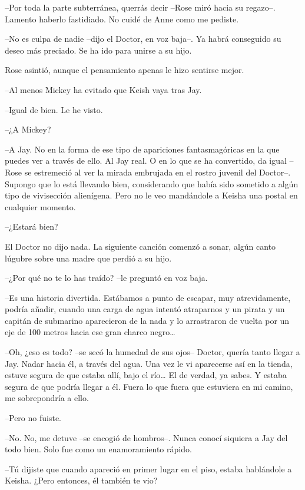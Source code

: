 {--Por toda la parte subterránea, querrás decir --Rose miró hacia su
regazo--. Lamento haberlo fastidiado. No cuidé de Anne como me pediste.}

{--No es culpa de nadie --dijo el Doctor, en voz baja--. Ya habrá
conseguido su deseo más preciado. Se ha ido para unirse a su hijo.}

{Rose asintió, aunque el pensamiento apenas le hizo sentirse mejor.}

{--Al menos Mickey ha evitado que Keish vaya tras Jay.}

{--Igual de bien. Le he visto.}

{--¿A Mickey?}

{--A Jay. No en la forma de ese tipo de apariciones fantasmagóricas en
 la que puedes ver a través de ello. Al Jay real. O en lo que se ha
 convertido, da igual --Rose se estremeció al ver la mirada embrujada en
 el rostro juvenil del Doctor--. Supongo que lo está llevando bien,
 considerando que había sido sometido a algún tipo de vivisección
 alienígena. Pero no le veo mandándole a Keisha una postal en cualquier
momento.}

{--¿Estará bien?}

{El Doctor no dijo nada. La siguiente canción comenzó a sonar, algún
canto lúgubre sobre una madre que perdió a su hijo.}

{--¿Por qué no te lo has traído? --le preguntó en voz baja.}

{--Es una historia divertida. Estábamos a punto de escapar, muy
 atrevidamente, podría añadir, cuando una carga de agua intentó
 atraparnos y un pirata y un capitán de submarino aparecieron de la nada
 y lo arrastraron de vuelta por un eje de 100 metros hacia ese gran
 charco negro\ldots{}}

{--Oh, ¿eso es todo? --se secó la humedad de sus ojos-- Doctor, quería
 tanto llegar a Jay. Nadar hacia él, a través del agua. Una vez le vi
 aparecerse así en la tienda, estuve segura de que estaba allí, bajo el
 río\ldots{} El de verdad, ya sabes. Y estaba segura de que podría llegar
 a él. Fuera lo que fuera que estuviera en mi camino, me sobrepondría a
ello.}

{--Pero no fuiste.}

{--No. No, me detuve --se encogió de hombros--. Nunca conocí siquiera a
Jay del todo bien. Solo fue como un enamoramiento rápido.}

{--Tú dijiste que cuando apareció en primer lugar en el piso, estaba
hablándole a Keisha. ¿Pero entonces, él también te vio?}

